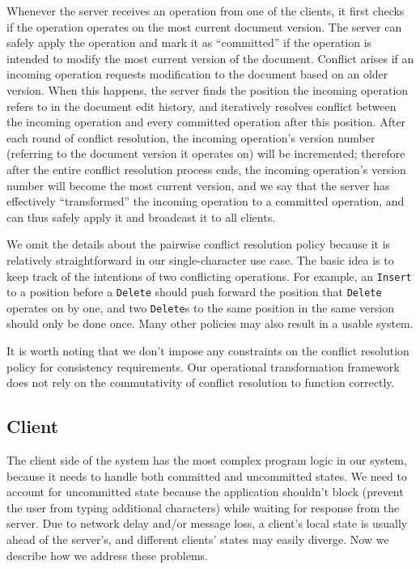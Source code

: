 Whenever the server receives an operation from one of the clients, it first
checks if the operation operates on the most current document version. The
server can safely apply the operation and mark it as ``committed'' if the
operation is intended to modify the most current version of the document.
Conflict arises if an incoming operation requests modification to the document
based on an older version. When this happens, the server finds the position the
incoming operation refers to in the document edit history, and iteratively
resolves conflict between the incoming operation and every committed operation
after this position. After each round of conflict resolution, the incoming
operation's version number (referring to the document version it operates on)
will be incremented; therefore after the entire conflict resolution process
ends, the incoming operation's version number will become the most current
version, and we say that the server has effectively ``transformed'' the incoming
operation to a committed operation, and can thus safely apply it and broadcast
it to all clients.

We omit the details about the pairwise conflict resolution policy because it is
relatively straightforward in our single-character use case. The basic idea is
to keep track of the intentions of two conflicting operations. For example, an
{\tt Insert} to a position before a {\tt Delete} should push forward the
position that {\tt Delete} operates on by one, and two {\tt Delete}s to the same
position in the same version should only be done once. Many other policies may
also result in a usable system.

It is worth noting that we don't impose any constraints on the conflict
resolution policy for consistency requirements. Our operational transformation
framework does not rely on the commutativity of conflict resolution to function
correctly.

\subsection{Client}
\label{sec:design_client}

The client side of the system has the most complex program logic in our system,
because it needs to handle both committed and uncommitted states. We need to
account for uncommitted state because the application shouldn't block (prevent
the user from typing additional characters) while waiting for response from the
server. Due to network delay and/or message loss, a client's local state is
usually ahead of the server's, and different clients' states may easily diverge.
Now we describe how we address these problems.

